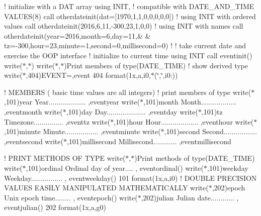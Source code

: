 ! initialize with a D\+AT array using I\+N\+IT, ! compatible with D\+A\+T\+E\+\_\+\+A\+N\+D\+\_\+\+T\+I\+ME V\+A\+L\+U\+E\+S(8) call otherdateinit(dat=\mbox{[}1970,1,1,0,0,0,0,0\mbox{]}) ! using I\+N\+IT with ordered values call otherdateinit(2016,6,11,-\/300,23,1,0,0) ! using I\+N\+IT with names call otherdateinit(year=2016,month=6,day=11,\& \& tz=-\/300,hour=23,minute=1,second=0,millisecond=0) ! ! take current date and exercise the O\+OP interface ! initialize to current time using I\+N\+IT call eventinit() write($\ast$,$\ast$) write($\ast$,$\ast$)\textquotesingle{}Print members of type(\+D\+A\+T\+E\+\_\+\+T\+I\+M\+E)\textquotesingle{} ! show derived type write($\ast$,404)\textquotesingle{}E\+V\+E\+NT=\textquotesingle{},event 404 format(1x,a,i0,$\ast$(\char`\"{},\char`\"{},i0\+:))

! M\+E\+M\+B\+E\+RS ( basic time values are all integers) ! print members of type write($\ast$,101)\textquotesingle{}year Year................... \textquotesingle{},eventyear write($\ast$,101)\textquotesingle{}month Month.................. \textquotesingle{},eventmonth write($\ast$,101)\textquotesingle{}day Day.................... \textquotesingle{},eventday write($\ast$,101)\textquotesingle{}tz Timezone............... \textquotesingle{},eventtz write($\ast$,101)\textquotesingle{}hour Hour................... \textquotesingle{},eventhour write($\ast$,101)\textquotesingle{}minute Minute................. \textquotesingle{},eventminute write($\ast$,101)\textquotesingle{}second Second................. \textquotesingle{},eventsecond write($\ast$,101)\textquotesingle{}millisecond Millisecond............ \textquotesingle{},eventmillisecond

! P\+R\+I\+NT M\+E\+T\+H\+O\+DS OF T\+Y\+PE write($\ast$,$\ast$)\textquotesingle{}Print methods of type(\+D\+A\+T\+E\+\_\+\+T\+I\+M\+E)\textquotesingle{} write($\ast$,101)\textquotesingle{}ordinal Ordinal day of year.... \textquotesingle{}, eventordinal() write($\ast$,101)\textquotesingle{}weekday Weekday................ \textquotesingle{}, eventweekday() 101 format(1x,a,i0) ! D\+O\+U\+B\+LE P\+R\+E\+C\+I\+S\+I\+ON V\+A\+L\+U\+ES E\+A\+S\+I\+LY M\+A\+N\+I\+P\+U\+L\+A\+T\+ED M\+A\+T\+H\+E\+M\+A\+T\+I\+C\+A\+L\+LY write($\ast$,202)\textquotesingle{}epoch Unix epoch time........ \textquotesingle{}, eventepoch() write($\ast$,202)\textquotesingle{}julian Julian date............ \textquotesingle{}, eventjulian() 202 format(1x,a,g0)

